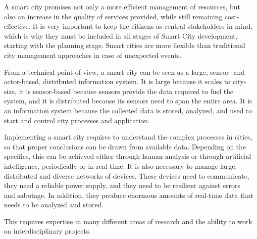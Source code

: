 A smart city promises not only a more efficient management of resources, but also an increase in the quality of services provided, while still remaining cost-effective. It is very important to keep the citizens as central stakeholders in mind, which is why they must be included in all stages of Smart City development, starting with the planning stage. Smart cities are more flexible than traditional city management approaches in case of unexpected events.

From a technical point of view, a smart city can be seen as a large, sensor- and actor-based, distributed information system. It is large because it scales to city-size, it is sensor-based because sensors provide the data required to fuel the system, and it is distributed because its sensors need to span the entire area. It is an information system because the collected data is stored, analyzed, and used to start and control city processes and application.

Implementing a smart city requires to understand the complex processes in cities, so that proper conclusions can be drawn from available data. Depending on the specifics, this can be achieved either through human analysis or through artificial intelligence, periodically or in real time. It is also necessary to manage large, distributed and diverse networks of devices. These devices need to communicate, they need a reliable power supply, and they need to be resilient against errors and sabotage. In addition, they produce enormous amounts of real-time data that needs to be analyzed and stored.

This requires expertise in many different areas of research and the ability to work on interdisciplinary projects.